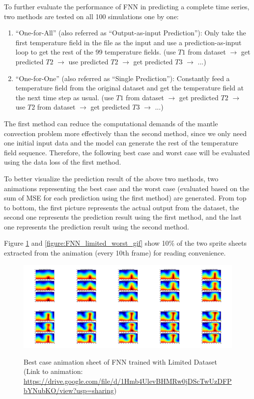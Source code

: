To further evaluate the performance of FNN in predicting a complete time series, two methods are tested on all 100 simulations one by one: 

\begin{enumerate}
  \item ``One-for-All'' (also referred as ``Output-as-input Prediction''): Only take the first temperature field in the file as the input and use a prediction-as-input loop to get the rest of the 99 temperature fields. (use $T1$ from dataset $\rightarrow$ get predicted $T2$ $\rightarrow$ use predicted $T2$ $\rightarrow$ get predicted $T3$ $\rightarrow$ ...)
  \item ``One-for-One'' (also referred as ``Single Prediction''): Constantly feed a temperature field from the original dataset and get the temperature field at the next time step as usual. (use $T1$ from dataset $\rightarrow$ get predicted $T2$ $\rightarrow$ use $T2$ from dataset $\rightarrow$ get predicted $T3$ $\rightarrow$ ...)
\end{enumerate}

The first method can reduce the computational demands of the mantle convection problem more effectively than the second method, since we only need one initial input data and the model can generate the rest of the temperature field sequence. Therefore, the following best case and worst case will be evaluated using the data loss of the first method.

To better visualize the prediction result of the above two methods, two animations representing the best case and the worst case (evaluated based on the sum of MSE for each prediction using the first method) are generated. From top to bottom, the first picture represents the actual output from the dataset, the second one represents the prediction result using the first method, and the last one represents the prediction result using the second method.

Figure \ref{figure:FNN_limited_best_gif} and \ref{figure:FNN_limited_worst_gif} show 10\% of the two sprite sheets extracted from the animation (every 10th frame) for reading convenience.

\begin{figure}[H]
    \centering
    \caption{Best case animation sheet of FNN trained with Limited Dataset (Link to animation: \url{https://drive.google.com/file/d/1Hmb4UlevBHMRw0jDScTwUzDFPbYNubKO/view?usp=sharing})}
    \includegraphics[scale=0.10]{figures/mantle_convection_images/limited_dataset/FNN_Best_GIF_sheet.png}
    \label{figure:FNN_limited_best_gif}
\end{figure}

